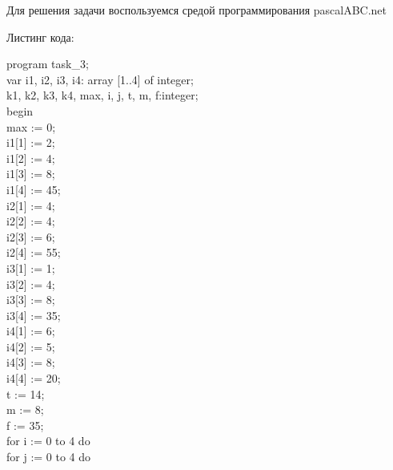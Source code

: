 \documentclass[russian,utf8,nocolumnxxxi,nocolumnxxxii]{eskdtext}
\begin{document}
Для решения задачи воспользуемся средой программирования pascalABC.net 

Листинг кода:

program task_3;\\
var i1, i2, i3, i4: array [1..4] of integer;\\
	k1, k2, k3, k4, max, i, j, t, m, f:integer;\\
begin\\

	max := 0;\\
	
	i1[1] := 2;\\
	
	i1[2] := 4;\\
	
	i1[3] := 8;\\
	
	i1[4] := 45;\\
	
	i2[1] := 4;\\
	
	i2[2] := 4;\\
	
	i2[3] := 6;\\
	
	i2[4] := 55;\\
    
    i3[1] := 1;\\
	
	i3[2] := 4;\\
	
	i3[3] := 8;\\
	
    i3[4] := 35;\\
	
	i4[1] := 6;\\
	
	i4[2] := 5;\\
	
	i4[3] := 8;\\
	
	i4[4] := 20;\\
	
	t := 14;\\
	
	m := 8;\\
	
	f := 35;\\
	
	for i := 0 to 4 do\\
	
		for j := 0 to 4 do\\
		
\end{document}
